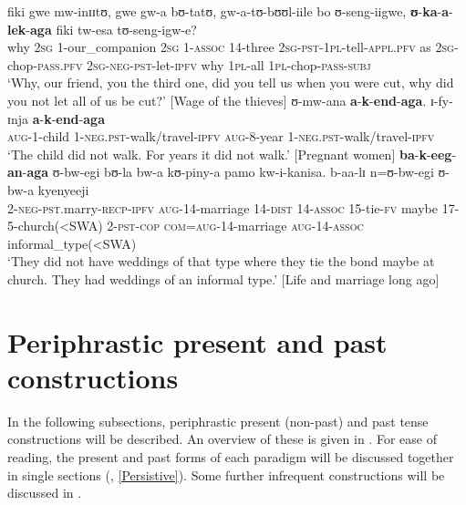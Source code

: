 \largerpage[2]
\begin{exe}
\ex \label{exNEGPASTIPFVcontinuous}\gll fiki gwe mw-inɪɪtʊ, gwe gw-a bʊ-tatʊ, gw-a-tʊ-bʊʊl-iile bo ʊ-seng-iigwe, \textbf{ʊ}-\textbf{ka}-\textbf{a}-\textbf{lek}-\textbf{aga} fiki tw-esa tʊ-seng-igw-e?\\
why \textsc{2sg} 1-our\_companion \textsc{2sg} 1-\textsc{assoc} 14-three \textsc{2sg}-\textsc{pst}-\textsc{1pl}-tell-\textsc{appl.pfv} as \textsc{2sg}-chop-\textsc{pass.pfv} \textsc{2sg}-\textsc{neg}-\textsc{pst}-let-\textsc{ipfv} why \textsc{1pl}-all \textsc{1pl}-chop-\textsc{pass}-\textsc{subj}\\
\glt `Why, our friend, you the third one, did you tell us when you were cut, why did you not let all of us be cut?' [Wage of the thieves]
\ex \label{exNEGPSTIPFVhab} \gll ʊ-mw-ana \textbf{a}-\textbf{k}-\textbf{end}-\textbf{aga}. ɪ-fy-ɪnja \textbf{a}-\textbf{k}-\textbf{end}-\textbf{aga}\\
\textsc{aug}-1-child 1-\textsc{neg}.\textsc{pst}-walk/travel-\textsc{ipfv} \textsc{aug}-8-year 1-\textsc{neg}.\textsc{pst}-walk/travel-\textsc{ipfv}\\
\glt `The child did not walk. For years it did not walk.' [Pregnant women]
\ex \label{exNEGPSTIPFVgen} \gll \textbf{ba}-\textbf{k}-\textbf{eeg}-\textbf{an}-\textbf{aga} ʊ-bw-egi bʊ-la bw-a kʊ-piny-a pamo kw-i-kanisa. b-aa-lɪ n=ʊ-bw-egi ʊ-bw-a kyenyeeji\\
2-\textsc{neg}-\textsc{pst}.marry-\textsc{recp}-\textsc{ipfv} \textsc{aug}-14-marriage 14-\textsc{dist} 14-\textsc{assoc} 15-tie-\textsc{fv} maybe 17-5-church(<SWA) 2-\textsc{pst}-\textsc{cop} \textsc{com}=\textsc{aug}-14-marriage \textsc{aug}-14-\textsc{assoc} informal\_type(<SWA)\\
\glt \lq They did not have weddings of that type where they tie the bond maybe at church. They had weddings of an informal type.' [Life and marriage long ago]  
\end{exe}


\section{Periphrastic present and past constructions}
\label{ComplexConstructions}
In the following subsections, periphrastic present (non-past) and past tense constructions will be described. An overview of these is given in . For ease of reading, the present and past forms of each paradigm will be discussed together in single sections (, \ref{Persistive}). Some further infrequent constructions will be discussed in .

